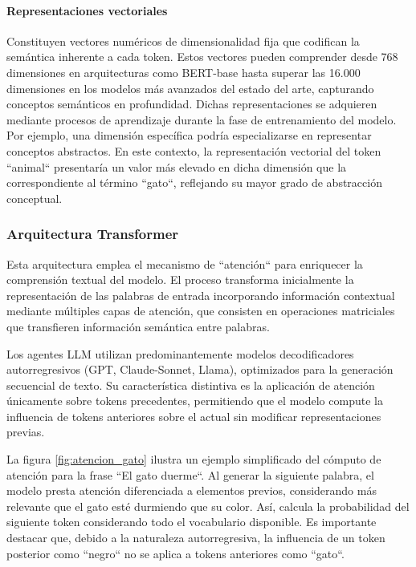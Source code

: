 \paragraph{Representaciones vectoriales}
Constituyen vectores numéricos de dimensionalidad fija que codifican la semántica inherente a cada token. Estos vectores pueden comprender desde 768 dimensiones en arquitecturas como BERT-base hasta superar las 16.000 dimensiones en los modelos más avanzados del estado del arte, capturando conceptos semánticos en profundidad. Dichas representaciones se adquieren mediante procesos de aprendizaje durante la fase de entrenamiento del modelo. Por ejemplo, una dimensión específica podría especializarse en representar conceptos abstractos. En este contexto, la representación vectorial del token ``animal`` presentaría un valor más elevado en dicha dimensión que la correspondiente al término ``gato``, reflejando su mayor grado de abstracción conceptual.

\subsubsection{Arquitectura Transformer}
Esta arquitectura emplea el mecanismo de ``atención`` para enriquecer la comprensión textual del modelo. El proceso transforma inicialmente la representación de las palabras de entrada incorporando información contextual mediante múltiples capas de atención, que consisten en operaciones matriciales que transfieren información semántica entre palabras. 

Los agentes LLM utilizan predominantemente modelos decodificadores autorregresivos (GPT, Claude-Sonnet, Llama), optimizados para la generación secuencial de texto. Su característica distintiva es la aplicación de atención únicamente sobre tokens precedentes, permitiendo que el modelo compute la influencia de tokens anteriores sobre el actual sin modificar representaciones previas.

La figura \ref{fig:atencion_gato} ilustra un ejemplo simplificado del cómputo de atención para la frase ``El gato duerme``. Al generar la siguiente palabra, el modelo presta atención diferenciada a elementos previos, considerando más relevante que el gato esté durmiendo que su color. Así, calcula la probabilidad del siguiente token considerando todo el vocabulario disponible. Es importante destacar que, debido a la naturaleza autorregresiva, la influencia de un token posterior como ``negro`` no se aplica a tokens anteriores como ``gato``.

